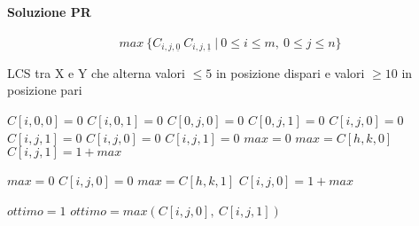 \documentclass[12pt]{article}
\begin{document}
\paragraph{Soluzione PR}
$$max \ \{C_{i, j, \underline{0}} \ C_{i, j, \underline{1}} \ | \ 0 \leq i \leq m, \ 0 \leq j \leq n\}$$
\begin{algorithm}
    \caption{LCS tra X e Y che alterna valori $\leq 5$ in posizione dispari e valori $\geq 10$ in posizione pari}
    \begin{algorithmic}
        \STATE $C[i, 0, 0]=0$
        \STATE $C[i, 0, 1]=0$
        \ENDFOR
        \STATE $C[0, j, 0]=0$
        \STATE $C[0, j, 1]=0$
        \ENDFOR
        \STATE $C[i,j,0]=0$
        \STATE $C[i,j,1]=0$
        \ENDIF
        \STATE $C[i,j,0]=0$
        \STATE $C[i,j,1]=0$
        \ENDIF
        \STATE $max=0$
        \STATE $max=C[h,k,0]$
        \ENDIF
        \ENDFOR
        \ENDFOR
        \STATE $C[i,j,1] = 1+max$
        \ENDIF

        \STATE $max=0$
        \STATE $C[i,j,0] = 0$
        \STATE $max=C[h,k,1]$
        \ENDIF
        \ENDFOR
        \ENDFOR
        \STATE $C[i,j,0] = 1+max$
        \ENDIF
        \ENDIF
        \ENDFOR
        \ENDFOR
    \end{algorithmic}
\end{algorithm}

\begin{algorithm}
    \begin{algorithmic}
        \STATE $ottimo=1$
        \STATE $ottimo = max(C[i,j,0], \ C[i,j,1])$
        \ENDIF
        \ENDFOR
        \ENDFOR
    \end{algorithmic}
\end{algorithm}
\FloatBarrier
\mbox{}\\
\end{document}
